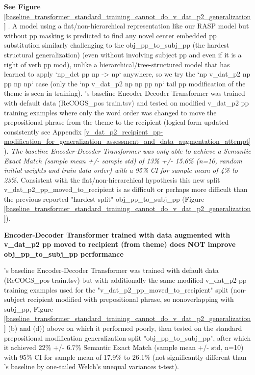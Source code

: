 \documentclass[11pt]{article}
\begin{document}
\textbf{See Figure} \ref{baseline_transformer_standard_training_cannot_do_v_dat_p2_generalization} . A model using a flat/non-hierarchical representation like our RASP model but without pp masking is predicted to find any novel center embedded pp substitution similarly challenging to the obj\_pp\_to\_subj\_pp (the hardest structural generalization) (even without involving subject pp and even if it is a right of verb pp mod), unlike a hierarchical/tree-structured model that has learned to apply `np\_det pp np -> np` anywhere, so we try the `np v\_dat\_p2 np pp np np` case (only the `np v\_dat\_p2 np np pp np` tail pp modification of the theme is seen in training). \cite{Wu2023}'s baseline Encoder-Decoder Transformer was trained with default data (ReCOGS\_pos train.tsv) and tested on modified v\_dat\_p2 pp training examples where only the word order was changed to move the prepositional phrase from the theme to the recipient (logical form updated consistently see Appendix \ref{v_dat_p2_recipient_pp-modification_for_generalization_assessment_and_data_augmentation_attempt}). \textit{The baseline \cite{Wu2023} Encoder-Decoder Transformer was only able to achieve a Semantic Exact Match (sample mean +/- sample std) of 13\% +/- 15.6\% (n=10, random initial weights and train data order) with a 95\% CI for sample mean of 4\% to 23\%}. Consistent with the flat/non-hierarchical hypothesis this new split v\_dat\_p2\_pp\_moved\_to\_recipient is as difficult or perhaps more difficult than the previous reported "hardest split" obj\_pp\_to\_subj\_pp (Figure \ref{baseline_transformer_standard_training_cannot_do_v_dat_p2_generalization}).


\textbf{\cite{Wu2023} Encoder-Decoder Transformer trained with data augmented with v\_dat\_p2 pp moved to recipient (from theme) does NOT improve obj\_pp\_to\_subj\_pp performance}

\cite{Wu2023}'s baseline Encoder-Decoder Transformer was trained with default data (ReCOGS\_pos train.tsv) but with additionally the same modified v\_dat\_p2 pp training examples used for the "v\_dat\_p2\_pp\_moved\_to\_recipient" split (non-subject recipient modified with prepositional phrase, so nonoverlapping with subj\_pp, Figure \ref{baseline_transformer_standard_training_cannot_do_v_dat_p2_generalization} (b) and (d)) above on which it performed poorly, then tested on the standard prepositional modification generalization split "obj\_pp\_to\_subj\_pp", after which it achieved 22\% +/- 6.7\% Semantic Exact Match (sample mean +/- std, n=10) with 95\% CI for sample mean of 17.9\% to 26.1\% (not significantly different than \cite{Wu2023}'s baseline by one-tailed Welch's unequal variances t-test).
\end{document}

